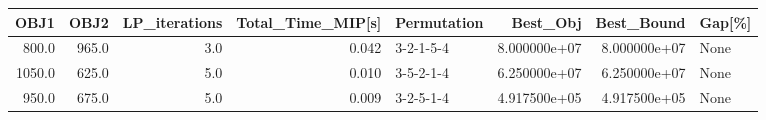 \begin{tabular}{rrrrlrrl}
\toprule
   OBJ1 &   OBJ2 &  LP\_iterations &  Total\_Time\_MIP[s] & Permutation &      Best\_Obj &    Best\_Bound & Gap[\%] \\
\midrule
  800.0 &  965.0 &            3.0 &              0.042 &   3-2-1-5-4 &  8.000000e+07 &  8.000000e+07 &   None \\
 1050.0 &  625.0 &            5.0 &              0.010 &   3-5-2-1-4 &  6.250000e+07 &  6.250000e+07 &   None \\
  950.0 &  675.0 &            5.0 &              0.009 &   3-2-5-1-4 &  4.917500e+05 &  4.917500e+05 &   None \\
\bottomrule
\end{tabular}
